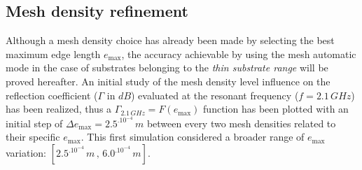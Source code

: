 \documentclass[10 pt,a4paper,twocolumn]{article}
\begin{document}
{\subsection*{Mesh density refinement}
Although a mesh density choice has already been made by selecting the best maximum edge length $e_{\max}$, the accuracy achievable by using the mesh automatic mode in the case of substrates belonging to the  \emph{thin substrate range} will be proved hereafter. An initial study of the mesh density level influence on the reflection coefficient ($\Gamma$ in $dB$) evaluated at the resonant frequency ($f=2.1\,GHz$) has been realized, thus a  $\Gamma_{2.1\,GHz}=F(e_{\max})$ function has been plotted with an initial step of $\Delta e_{\max} = 2.5^.10^{-4}\,m$ between every two mesh densities related to their specific $e_{\max}$. This first simulation considered a broader range of $e_{\max}$ variation: $[2.5^.10^{-4}\,m\,,\,6.0^.10^{-4}\,m]$. 
\indent 

}
\end{document}
